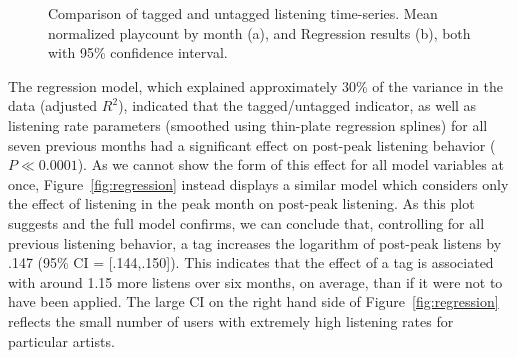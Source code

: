   \begin{figure}[t]
    \hfill
    \caption{Comparison of tagged and untagged listening time-series. Mean normalized playcount by month (a), and Regression results (b), both with 95\% confidence interval.}
    \label{fig:regressionFigs}
    \vspace{-2em}
  \end{figure}

The regression model, which explained approximately 30\% of the variance in the data (adjusted $R^{2}$), indicated that the tagged/untagged indicator, as well as listening rate parameters (smoothed using thin-plate regression splines) for all seven previous months had a significant effect on post-peak listening behavior ($P \ll 0.0001$). As we cannot show the form of this effect for all model variables at once, Figure~\ref{fig:regression} instead displays a similar model which considers only the effect of listening in the peak month on post-peak listening. As this plot suggests and the full model confirms, we can conclude that, controlling for all previous listening behavior, a tag increases the logarithm of post-peak listens by .147 (95\% CI = [.144,.150]). This indicates that the effect of a tag is associated with around 1.15 more listens over six months, on average, than if it were not to have been applied. The large CI on the right hand side of Figure~\ref{fig:regression} reflects the small number of users with extremely high listening rates for particular artists.

